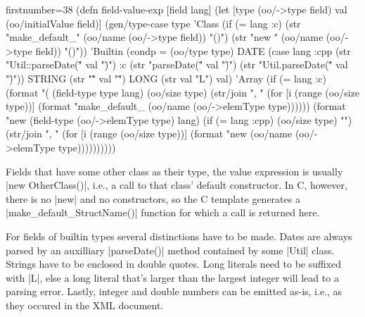 \documentclass[a4paper]{article}
\newcommand{\code}{\clojureinline}
\begin{document}
\begin{clojurecode*}{firstnumber=38}
(defn field-value-exp [field lang]
  (let [type (oo/->type field)
        val (oo/initialValue field)]
    (gen/type-case type
      'Class (if (= lang :c)
               (str "make_default_" (oo/name (oo/->type field)) "()")
               (str "new " (oo/name (oo/->type field)) "()"))
      'Builtin (condp = (oo/type type)
                 DATE   (case lang
                          :cpp (str "Util::parseDate(\"" val "\")")
                          :c   (str "parseDate(\"" val "\")")
                          (str "Util.parseDate(\"" val "\")"))
                 STRING (str "\"" val "\"")
                 LONG   (str val "L")
                 val)
      'Array (if (= lang :c)
               (format "(%
                       (field-type type lang)
                       (oo/size type)
                       (str/join ", " (for [i (range (oo/size type))]
                                        (format "make_default_%
                                                (oo/name (oo/->elemType type))))))
               (format "new %
                       (field-type (oo/->elemType type) lang)
                       (if (= lang :cpp) (oo/size type) "")
                       (str/join ", " (for [i (range (oo/size type))]
                                        (format "new %
                                                (oo/name (oo/->elemType type))))))))))
\end{clojurecode*}

Fields that have some other class as their type, the value expression is
usually \code|new OtherClass()|, i.e., a call to that class' default
constructor.  In C, however, there is no \code|new| and no constructors, so the
C template generates a \code|make_default_StructName()| function for which a
call is returned here.

For fields of builtin types several distinctions have to be made.  Dates are
always parsed by an auxilliary \code|parseDate()| method contained by some
\code|Util| class.  Strings have to be enclosed in double quotes.  Long
literals need to be suffixed with \code|L|, else a long literal that's larger
than the largest integer will lead to a parsing error.  Lastly, integer and
double numbers can be emitted as-is, i.e., as they occured in the XML document.
\end{document}
